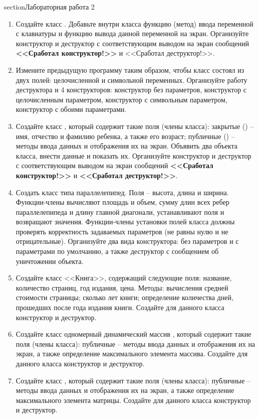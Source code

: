 section{Лабораторная работа 2}
\begin{enumerate}[leftmargin=*]
    \item Создайте класс . Добавьте внутри класса функцию (метод) ввода переменной с клавиатуры и функцию вывода данной переменной на экран. Организуйте конструктор и деструктор с соответствующим выводом на экран сообщений \textbf{<<Сработал конструктор!>>} и <<Сработал деструктор!>>.
    \item Измените предыдущую программу таким образом, чтобы класс  состоял из двух полей: целочисленной и символьной переменных. Организуйте работу деструктора и 4 конструкторов: конструктор без параметров, конструктор с целочисленным параметром, конструктор с символьным параметром, конструктор с обоими параметрами. 
    \item Создайте класс , который содержит такие поля (члены класса): закрытые () – имя, отчество и фамилию ребенка, а также его возраст; публичные () – методы ввода данных и отображения их на экран. Объявить два объекта класса, внести данные и показать их. Организуйте конструктор и деструктор с соответствующим выводом на экран сообщений \textbf{<<Сработал конструктор!>>} и \textbf{<<Сработал деструктор!>>}.
    \item Создать класс типа параллелепипед. Поля – высота, длина и ширина. Функции-члены вычисляют площадь и объем, сумму длин всех ребер параллелепипеда и длину главной диагонали, устанавливают поля и возвращают значения. Функции-члены установки полей класса должны проверять корректность задаваемых параметров (не равны нулю и не отрицательные). Организуйте два вида конструктора: без параметров и с параметрами по умолчанию, а также деструктор с сообщением об уничтожении объекта.
    \item Создайте класс <<Книга>>, содержащий следующие поля: название, количество страниц, год издания, цена. Методы: вычисления средней стоимости страницы; сколько лет книги; определение количества дней, прошедших после года издания книги. Создайте для данного класса конструктор и деструктор.
    \item Создайте класс одномерный динамический массив , который содержит такие поля (члены класса): публичные – методы ввода данных и отображения их на экран, а также определение максимального элемента массива. Создайте для данного класса конструктор и деструктор.
    \item Создайте класс , который содержит такие поля (члены класса): публичные – методы ввода данных и отображения их на экран, а также определение максимального элемента матрицы. Создайте для данного класса конструктор и деструктор.
\end{enumerate}